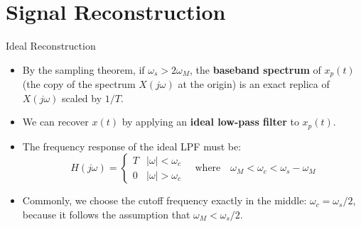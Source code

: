 \section{Signal Reconstruction}

\begin{frame}{Ideal Reconstruction}
  \begin{itemize}
    \item By the sampling theorem, if $\omega_s > 2\omega_M$, the \textbf{baseband spectrum} of $x_p(t)$ (the copy of the spectrum $X(j\omega)$ at the origin)
      is an exact replica of $X(j\omega)$ scaled by $1/T$.

    \item We can recover $x(t)$ by applying an \textbf{ideal low-pass filter} to $x_p(t)$.
  \end{itemize}
  \begin{center}
  \end{center}
  \begin{itemize}
    \item The frequency response of the ideal LPF must be:
      \begin{equation*}
        H(j\omega) =
        \begin{cases}
          T & |\omega| < \omega_c \\
          0 & |\omega| > \omega_c
        \end{cases} \quad \text{where} \quad \omega_M < \omega_c < \omega_s - \omega_M
      \end{equation*}
    \item Commonly, we choose the cutoff frequency exactly in the middle: $\omega_c = \omega_s/2$, because it follows the assumption that $\omega_M < \omega_s/2$.
  \end{itemize}
\end{frame}

